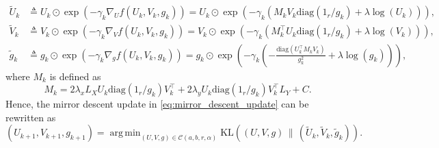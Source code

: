 \documentclass{article}
\theoremstyle{definition}
\newcommand{\cC}{\mathcal{C}}
\DeclareMathOperator*{\argmin}{arg\,min}
\begin{document}
\begin{align*}
    \tilde{U}_k & \triangleq U_k \odot \exp(-\gamma_k \nabla_U f(U_k, V_k, g_k)) = U_k \odot \exp\left(-\gamma_k \left(M_k V_k \mathrm{diag}(1_r / g_k) + \lambda \log(U_k)\right)\right), \\
    \tilde{V}_k & \triangleq V_k \odot \exp(-\gamma_k \nabla_V f(U_k, V_k, g_k)) = V_k \odot \exp\left(-\gamma_k \left(M_k^\top U_k \mathrm{diag}(1_r / g_k) + \lambda \log(V_k)\right)\right), \\
    \tilde{g}_k & \triangleq g_k \odot \exp(-\gamma_k \nabla_g f(U_k, V_k, g_k)) = g_k \odot \exp\left(-\gamma_k \left(- \frac{\mathrm{diag}(U_k^\top M_k V_k)}{g_k^2} + \lambda \log(g_k)\right)\right),
\end{align*}
where $M_k$ is defined as
\begin{equation*}
    M_k = 2 \lambda_x L_X U_k \mathrm{diag}(1_r / g_k) V_k^\top + 2 \lambda_y U_k \mathrm{diag}(1_r / g_k) V_k^\top L_Y + C.
\end{equation*}
Hence, the mirror descent update in \eqref{eq:mirror_descent_update} can be rewritten as
\begin{equation}
    \label{eq:mirror_descent_update_simplified}
    (U_{k + 1}, V_{k + 1}, g_{k + 1}) = \argmin_{(U, V, g) \in \cC(a, b, r, \alpha)} \mathrm{KL}\left((U, V, g) \, \| \, (\tilde{U}_k, \tilde{V}_k, \tilde{g}_k)\right).
\end{equation}
\end{document}
